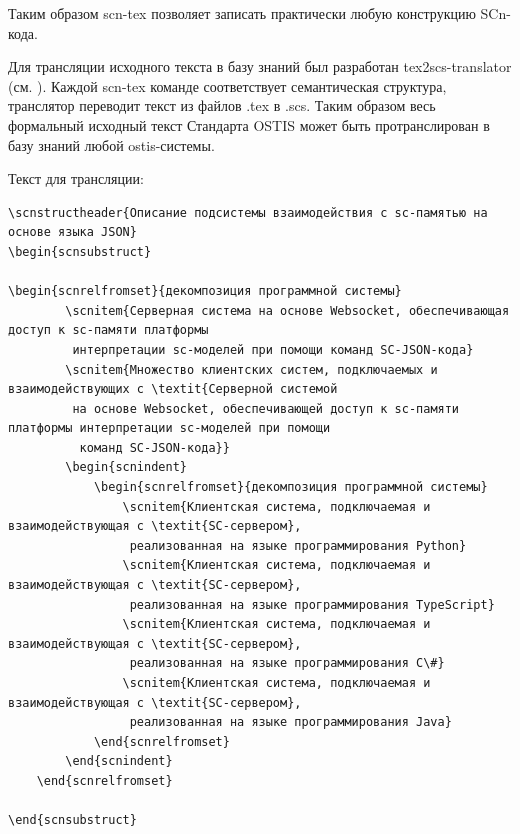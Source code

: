 

Таким образом scn-tex позволяет записать практически любую конструкцию SCn-кода.

Для трансляции исходного текста в базу знаний был разработан tex2scs-translator (см. ). Каждой scn-tex команде соответствует семантическая структура, транслятор переводит текст из файлов .tex в .scs. Таким образом весь формальный исходный текст Стандарта OSTIS может быть протранслирован в базу знаний любой ostis-системы.


Текст для трансляции:


\begin{verbatim}
\scnstructheader{Описание подсистемы взаимодействия c sc-памятью на основе языка JSON}
\begin{scnsubstruct}

\begin{scnrelfromset}{декомпозиция программной системы}
		\scnitem{Серверная система на основе Websocket, обеспечивающая доступ к sc-памяти платформы
		 интерпретации sc-моделей при помощи команд SC-JSON-кода}
		\scnitem{Множество клиентских систем, подключаемых и взаимодействующих с \textit{Серверной системой
		 на основе Websocket, обеспечивающей доступ к sc-памяти платформы интерпретации sc-моделей при помощи
		  команд SC-JSON-кода}}
		\begin{scnindent}
			\begin{scnrelfromset}{декомпозиция программной системы}
				\scnitem{Клиентская система, подключаемая и взаимодействующая с \textit{SC-сервером},
				 реализованная на языке программирования Python}
				\scnitem{Клиентская система, подключаемая и взаимодействующая с \textit{SC-сервером},
				 реализованная на языке программирования TypeScript}
				\scnitem{Клиентская система, подключаемая и взаимодействующая с \textit{SC-сервером},
				 реализованная на языке программирования C\#}
				\scnitem{Клиентская система, подключаемая и взаимодействующая с \textit{SC-сервером},
				 реализованная на языке программирования Java}
			\end{scnrelfromset}
		\end{scnindent}
    \end{scnrelfromset}

\end{scnsubstruct}
\end{verbatim}


